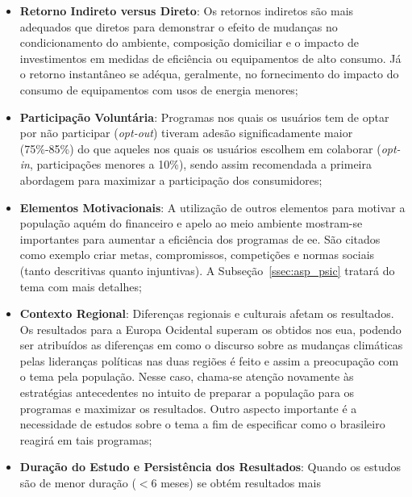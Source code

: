 \begin{itemize}
\item \textbf{Retorno Indireto versus Direto}:
Os retornos indiretos são mais adequados que diretos
para demonstrar o efeito de mudanças no condicionamento do ambiente,
composição domiciliar e o impacto de investimentos
em medidas de eficiência ou equipamentos de alto consumo. Já o retorno instantâneo
se adéqua, geralmente, no fornecimento do impacto do consumo de equipamentos com
usos de energia menores;
\item \textbf{Participação Voluntária}: Programas nos quais os usuários tem de
optar por não participar (\emph{opt-out}) tiveram adesão significadamente
maior (75\%-85\%) do que aqueles nos quais os usuários escolhem em colaborar
(\emph{opt-in}, participações menores a 10\%), sendo assim recomendada
a primeira abordagem para maximizar a participação dos consumidores;
\item \textbf{Elementos Motivacionais}: A utilização de outros elementos para
motivar a população aquém do financeiro e apelo ao meio ambiente mostram-se
importantes para aumentar a eficiência dos programas de \gls{ee}. São citados
como exemplo criar metas, compromissos, competições e normas sociais
(tanto descritivas quanto injuntivas). A Subseção~\ref{ssec:asp_psic}
tratará do tema com mais detalhes;
\item \textbf{Contexto Regional}: Diferenças regionais e culturais afetam os
resultados. Os resultados para a Europa Ocidental superam os obtidos nos
\gls{eua}, podendo ser atribuídos as diferenças em como o
discurso sobre as mudanças climáticas pelas lideranças políticas nas duas regiões
é feito e assim a preocupação com o tema pela população. Nesse caso, chama-se atenção
novamente às estratégias antecedentes no intuito de preparar a população para os programas e
maximizar os resultados. Outro aspecto importante é a necessidade de estudos
sobre o tema a fim de especificar como o brasileiro reagirá em tais programas;
\item \textbf{Duração do Estudo e Persistência dos Resultados}: Quando os
estudos são de menor duração ($< 6$ meses) se obtém resultados mais

\end{itemize}
